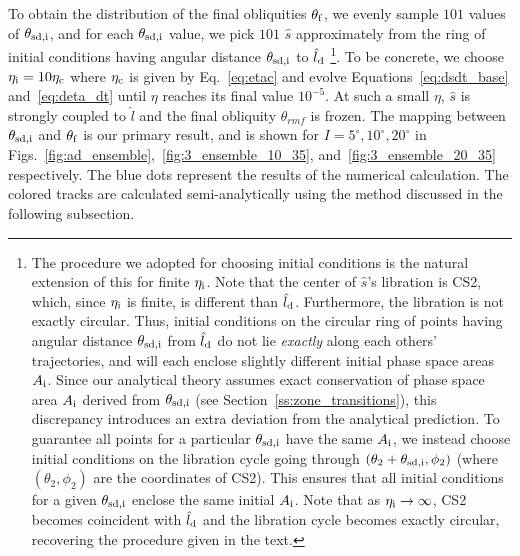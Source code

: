 \documentclass[
        fleqn,
        usenatbib,
        referee,
    ]{mnras}
\newcommand*{\p}[1]{\left(#1\right)}
\begin{document}
To obtain the distribution of the final obliquities $\theta_{\rm f}$, we evenly
sample $101$ values of $\theta_{\rm sd, i}$, and for each $\theta_{\rm sd, i}$
value, we pick $101$ $\hat{s}$ approximately from the ring of initial conditions
having angular distance $\theta_{\rm sd, i}$ to $\hat{l}_{\rm d}$%
%
\footnote{
The procedure we adopted for choosing initial conditions is the natural
extension of this for finite $\eta_{\rm i}$. Note that the center of $\hat{s}$'s
libration is CS2, which, since $\eta_{\rm i}$ is finite, is different than
$\hat{l}_{\rm d}$. Furthermore, the libration is not exactly circular. Thus,
initial conditions on the circular ring of points having angular distance
$\theta_{\rm sd, i}$ from $\hat{l}_{\rm d}$ do not lie \emph{exactly} along each
others' trajectories, and will each enclose slightly different initial phase
space areas $A_{\rm i}$. Since our analytical theory assumes exact conservation
of phase space area $A_{\rm i}$ derived from $\theta_{\rm sd, i}$ (see
Section~\ref{ss:zone_transitions}), this discrepancy introduces an extra
deviation from the analytical prediction. To guarantee all points for a
particular $\theta_{\rm sd, i}$ have the same $A_{\rm i}$, we instead choose
initial conditions on the libration cycle going through $\p{\theta_2 +
\theta_{\rm sd, i}, \phi_2}$ (where $\p{\theta_2, \phi_2}$ are the coordinates
of CS2). This ensures that all initial conditions for a given $\theta_{\rm sd,
i}$ enclose the same initial $A_{\rm i}$. Note that as $\eta_{\rm i} \to
\infty$, CS2 becomes coincident with $\hat{l}_{\rm d}$ and the libration cycle
becomes exactly circular, recovering the procedure given in the text.}.
%
To be concrete, we choose $\eta_{\rm i} = 10\eta_{\rm c}$ where $\eta_{\rm c}$
is given by Eq.~\eqref{eq:etac} and evolve Equations~\ref{eq:dsdt_base}
and~\ref{eq:deta_dt} until $\eta$ reaches its final value $10^{-5}$. At such a
small $\eta$, $\hat{s}$ is strongly coupled to $\hat{l}$ and the final obliquity
$\theta_{rm f}$ is frozen. The mapping between $\theta_{\rm sd, i}$ and
$\theta_{\rm f}$ is our primary result, and is shown for $I = 5^\circ, 10^\circ,
20^\circ$ in Figs.~\ref{fig:ad_ensemble},~\ref{fig:3_ensemble_10_35},
and~\ref{fig:3_ensemble_20_35} respectively. The blue dots represent the results
of the numerical calculation. The colored tracks are calculated
semi-analytically using the method discussed in the following subsection.
\end{document}
